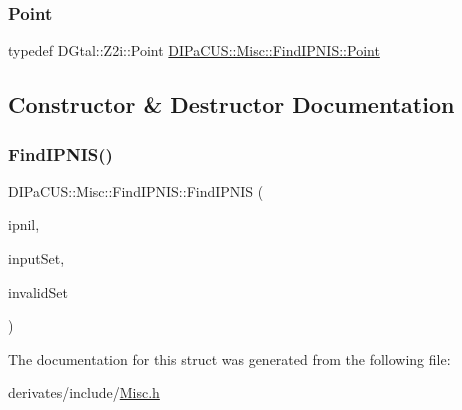 \subsubsection{\texorpdfstring{Point}{Point}}
{\footnotesize\ttfamily typedef D\+Gtal\+::\+Z2i\+::\+Point \mbox{\hyperlink{structDIPaCUS_1_1Misc_1_1FindIPNIS_af4506f1e1704bc3ee542ee3000694ee1}{D\+I\+Pa\+C\+U\+S\+::\+Misc\+::\+Find\+I\+P\+N\+I\+S\+::\+Point}}}



\subsection{Constructor \& Destructor Documentation}
\mbox{\label{structDIPaCUS_1_1Misc_1_1FindIPNIS_a2a14b039bc1efdc8adfa4285d8b65972}} 
\subsubsection{\texorpdfstring{Find\+I\+P\+N\+I\+S()}{FindIPNIS()}}
{\footnotesize\ttfamily D\+I\+Pa\+C\+U\+S\+::\+Misc\+::\+Find\+I\+P\+N\+I\+S\+::\+Find\+I\+P\+N\+IS (\begin{DoxyParamCaption}\item[{\mbox{\hyperlink{structDIPaCUS_1_1Misc_1_1FindIPNIS_af4506f1e1704bc3ee542ee3000694ee1}{Point}} \&}]{ipnil,  }\item[{const \mbox{\hyperlink{structDIPaCUS_1_1Misc_1_1FindIPNIS_aa92a8a962ef5fb194297977646f84dc4}{Digital\+Set}} \&}]{input\+Set,  }\item[{const \mbox{\hyperlink{structDIPaCUS_1_1Misc_1_1FindIPNIS_aa92a8a962ef5fb194297977646f84dc4}{Digital\+Set}} \&}]{invalid\+Set }\end{DoxyParamCaption})\hspace{0.3cm}{\ttfamily [inline]}}



The documentation for this struct was generated from the following file\+:\begin{DoxyCompactItemize}
\item 
derivates/include/\mbox{\hyperlink{Misc_8h}{Misc.\+h}}\end{DoxyCompactItemize}
